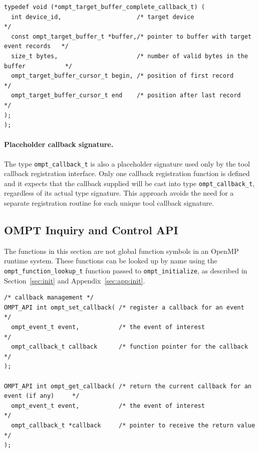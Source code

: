 \documentclass{article}
\begin{document}
{\begin{verbatim}
typedef void (*ompt_target_buffer_complete_callback_t) (
  int device_id,                     /* target device                                 */
  const ompt_target_buffer_t *buffer,/* pointer to buffer with target event records   */
  size_t bytes,                      /* number of valid bytes in the buffer           */
  ompt_target_buffer_cursor_t begin, /* position of first record                      */
  ompt_target_buffer_cursor_t end    /* position after last record                    */ 
); 
);
\end{verbatim}

\paragraph{Placeholder callback signature.} The type \verb|ompt_callback_t| is also a placeholder signature used only by the tool callback registration interface. 
Only one callback registration function is defined and it expects that the callback supplied will be cast into type \verb|ompt_callback_t|, regardless of its actual type signature. This approach avoids the need for a separate registration routine for each unique tool callback signature. 

\clearpage
\subsection{OMPT Inquiry and Control API}

The functions in this section are not global function symbols in an OpenMP runtime system. These functions can be looked up by name using the \verb|ompt_function_lookup_t| function passed to \verb|ompt_initialize|, as described in Section~\ref{sec:init} and Appendix~\ref{sec:app:init}.

\begin{verbatim}
/* callback management */
OMPT_API int ompt_set_callback( /* register a callback for an event                      */
  ompt_event_t event,           /* the event of interest                                 */
  ompt_callback_t callback      /* function pointer for the callback                     */
);

OMPT_API int ompt_get_callback( /* return the current callback for an event (if any)     */
  ompt_event_t event,           /* the event of interest                                 */
  ompt_callback_t *callback     /* pointer to receive the return value                   */
);


\end{verbatim}}
\end{document}
